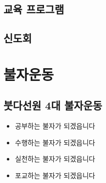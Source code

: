 \documentclass[12pt, a4paper, oneside]{book}
\let\stdsection\section
\renewcommand\section{\newpage\stdsection}
\begin{document}
%
	\section{교육 프로그램}



%
	\section{신도회}







	\chapter{ 불자운동 }
	\noptcrule

	\newpage	
	\minitoc


%
	\section{붓다선원 4대 불자운동 }


\begin{itemize}[					
		topsep=0.0em,			
		parsep=0.0em,			
		itemsep=0em,			
		leftmargin=		2	em,
		labelwidth=1em,			
		labelsep=1em			
]					
	\item	공부하는 불자가 되겠읍니다
	\item	수행하는 불자가 되겠읍니다
	\item	실천하는 불자가 되겠읍니다
	\item	포교하는 불자가 되겠읍니다
\end{itemize}					




%
\end{document}

